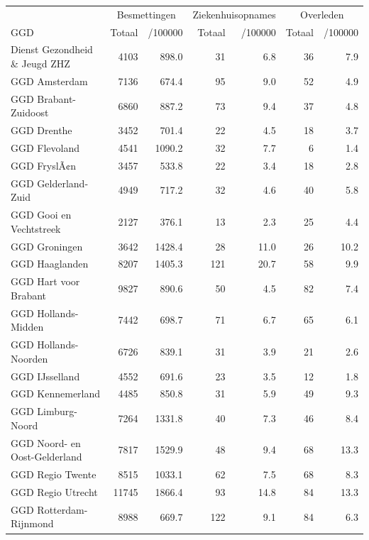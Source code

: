\documentclass[
  english,
  man,floatsintext]{apa6}
\begin{document}
\begin{table}[H]
\centering\begingroup\fontsize{10}{12}\selectfont

\begin{threeparttable}
\begin{tabular}{lrrrrrr}
\toprule
\multicolumn{1}{c}{ } & \multicolumn{2}{c}{Besmettingen} & \multicolumn{2}{c}{Ziekenhuisopnames} & \multicolumn{2}{c}{Overleden} \\
\cmidrule(l{3pt}r{3pt}){2-3} \cmidrule(l{3pt}r{3pt}){4-5} \cmidrule(l{3pt}r{3pt}){6-7}
GGD & Totaal & /100000 & Totaal & /100000 & Totaal & /100000\\
\midrule
Dienst Gezondheid \& Jeugd ZHZ & 4103 & 898.0 & 31 & 6.8 & 36 & 7.9\\
GGD Amsterdam & 7136 & 674.4 & 95 & 9.0 & 52 & 4.9\\
GGD Brabant-Zuidoost & 6860 & 887.2 & 73 & 9.4 & 37 & 4.8\\
GGD Drenthe & 3452 & 701.4 & 22 & 4.5 & 18 & 3.7\\
GGD Flevoland & 4541 & 1090.2 & 32 & 7.7 & 6 & 1.4\\
GGD FryslÃ¢n & 3457 & 533.8 & 22 & 3.4 & 18 & 2.8\\
GGD Gelderland-Zuid & 4949 & 717.2 & 32 & 4.6 & 40 & 5.8\\
GGD Gooi en Vechtstreek & 2127 & 376.1 & 13 & 2.3 & 25 & 4.4\\
GGD Groningen & 3642 & 1428.4 & 28 & 11.0 & 26 & 10.2\\
GGD Haaglanden & 8207 & 1405.3 & 121 & 20.7 & 58 & 9.9\\
GGD Hart voor Brabant & 9827 & 890.6 & 50 & 4.5 & 82 & 7.4\\
GGD Hollands-Midden & 7442 & 698.7 & 71 & 6.7 & 65 & 6.1\\
GGD Hollands-Noorden & 6726 & 839.1 & 31 & 3.9 & 21 & 2.6\\
GGD IJsselland & 4552 & 691.6 & 23 & 3.5 & 12 & 1.8\\
GGD Kennemerland & 4485 & 850.8 & 31 & 5.9 & 49 & 9.3\\
GGD Limburg-Noord & 7264 & 1331.8 & 40 & 7.3 & 46 & 8.4\\
GGD Noord- en Oost-Gelderland & 7817 & 1529.9 & 48 & 9.4 & 68 & 13.3\\
GGD Regio Twente & 8515 & 1033.1 & 62 & 7.5 & 68 & 8.3\\
GGD Regio Utrecht & 11745 & 1866.4 & 93 & 14.8 & 84 & 13.3\\
GGD Rotterdam-Rijnmond & 8988 & 669.7 & 122 & 9.1 & 84 & 6.3\\

\end{tabular}
\end{threeparttable}
\end{table}
\end{document}
